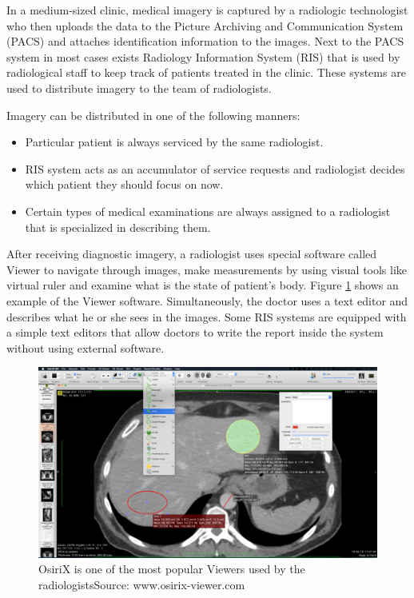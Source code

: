 \documentclass[12pt, twoside, openany]{report}
\theoremstyle{definition}
\begin{document}
In a medium-sized clinic, medical imagery is captured by a radiologic technologist who then uploads the data to the Picture Archiving and Communication System (PACS) and attaches identification information to the images. Next to the PACS system in most cases exists Radiology Information System (RIS) that is used by radiological staff to keep track of patients treated in the clinic. These systems are used to distribute imagery to the team of radiologists.

Imagery can be distributed in one of the following manners:
\begin{itemize}
    \item Particular patient is always serviced by the same radiologist.
    \item RIS system acts as an accumulator of service requests and radiologist decides which patient they should focus on now.
    \item Certain types of medical examinations are always assigned to a radiologist that is specialized in describing them.
\end{itemize}

After receiving diagnostic imagery, a radiologist uses special software called Viewer\cite{viewer} to navigate through images, make measurements by using visual tools like virtual ruler and examine what is the state of patient's body. Figure \ref{fig:osirix} shows an example of the Viewer software. Simultaneously, the doctor uses a text editor and describes what he or she sees in the images. Some RIS systems are equipped with a simple text editors that allow doctors to write the report inside the system without using external software. 

\begin{figure}
    \centering
    \includegraphics[width=0.9\linewidth]{osirix}
    \caption{OsiriX is one of the most popular Viewers used by the radiologists\hspace{\textwidth}Source: www.osirix-viewer.com}
    \label{fig:osirix}

\end{figure}
\end{document}
